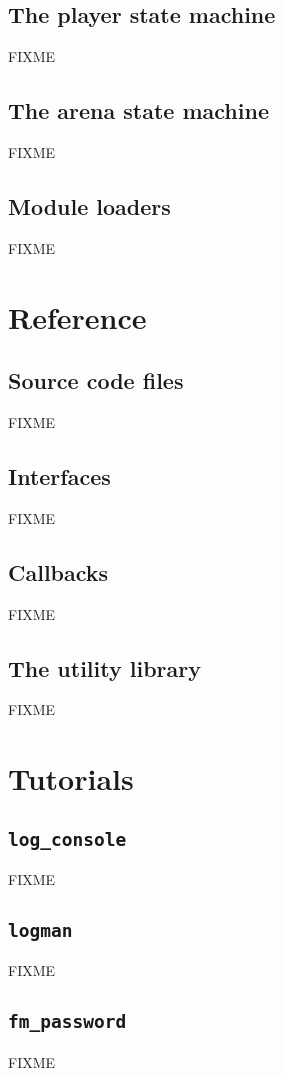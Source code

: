 \documentclass{article}
\begin{document}
\subsection{The player state machine}

FIXME

\subsection{The arena state machine}

FIXME

\subsection{Module loaders}

FIXME


\section{Reference}

\subsection{Source code files}

FIXME

\subsection{Interfaces}

FIXME

\subsection{Callbacks}

FIXME

\subsection{The utility library}

FIXME




\section{Tutorials}

\subsection{\texttt{log\_console}}

FIXME

\subsection{\texttt{logman}}

FIXME

\subsection{\texttt{fm\_password}}

FIXME
\end{document}
